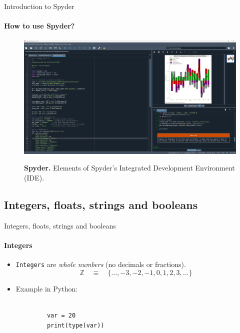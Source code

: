 \documentclass[notes,11pt, aspectratio=169, xcolor=table]{beamer}
\begin{document}
    \begin{frame}{Introduction to Spyder}
    \framesubtitle{How to use Spyder?}
        
        \begin{figure}
            \begin{center}
                \colorbox{white}{
                    \includegraphics[scale=0.2]{figs/spyder.PNG} 
                }
            \end{center}
            \caption[Diagrama de Conway]{\textbf{Spyder.} Elements of Spyder's Integrated Development Environment (IDE). \label{fig:spyder}}
        \end{figure}  

    
   

    \end{frame}

\subsection{Integers, floats, strings and booleans}  

    \begin{frame}[fragile=singleslide]{Integers, floats, strings and booleans}
    \framesubtitle{Integers}

        \begin{itemize}
            \item \texttt{Integers} are \textit{whole numbers} (no decimals or fractions).
            \begin{equation}
                \mathbb{Z} \quad \equiv \quad \{ \hdots, -3, -2, -1, 0, 1, 2, 3, \hdots \}
            \end{equation}
             
            \item Example in Python:
        \end{itemize}

        \begin{verbatim}
        
            var = 20
            print(type(var))
        \end{verbatim}    
   

    \end{frame}
    
\end{document}
